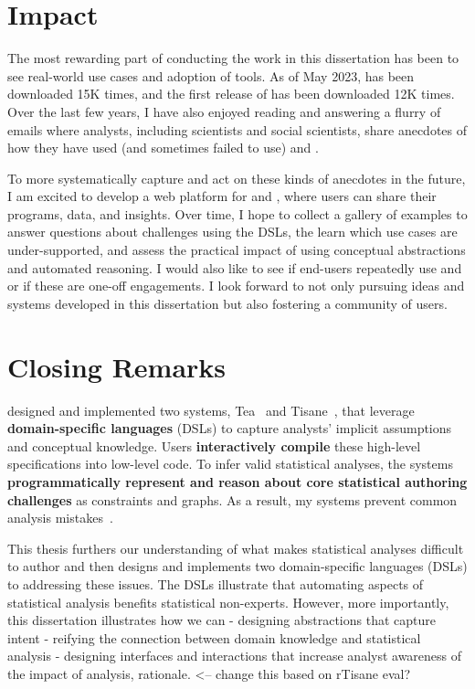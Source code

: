 \section{Impact}
The most rewarding part of conducting the work in this dissertation has been to
see real-world use cases and adoption of tools. As of May 2023, \tea has been
downloaded 15K times, and the first release of \tisane has been downloaded 12K
times. Over the last few years, I have also enjoyed reading and answering a
flurry of emails where analysts, including scientists and social scientists,
share anecdotes of how they have used (and sometimes failed to use) \tea and
\tisane.


To more systematically capture and act on these kinds of anecdotes in the
future, I am excited to develop a web platform for \tea and \tisane, where users
can share their programs, data, and insights. Over time, I hope to collect a
gallery of examples to answer questions about challenges using the DSLs, the
learn which use cases are under-supported, and assess the practical impact of
using conceptual abstractions and automated reasoning. I would also like to see
if end-users repeatedly use \tea and \tisane or if these are one-off
engagements. I look forward to not only pursuing ideas and systems developed in
this dissertation but also fostering a community of users. 


\section{Closing Remarks}

designed and implemented two systems, Tea~\cite{jun2019tea} and
Tisane~\cite{jun2022tisane}, that leverage \textbf{domain-specific languages}
(DSLs) to capture analysts' implicit assumptions and conceptual knowledge. Users
\textbf{interactively compile} these high-level specifications into low-level
code. To infer valid statistical analyses, the systems \textbf{programmatically
represent and reason about core statistical authoring challenges} as constraints
and graphs.%
As a result, my systems prevent common analysis
mistakes~\cite{jun2019tea,jun2022tisane}. 

This thesis furthers our understanding of what makes statistical analyses
difficult to author and then designs and implements two domain-specific
languages (DSLs) to addressing these issues. The DSLs illustrate that automating
aspects of statistical analysis benefits statistical non-experts. However, more
importantly, this dissertation illustrates how we can 
- designing abstractions that capture intent 
- reifying the connection between domain knowledge and statistical analysis 
- designing interfaces and interactions that increase analyst awareness of the impact of analysis, rationale. <-- change this based on rTisane eval? 
